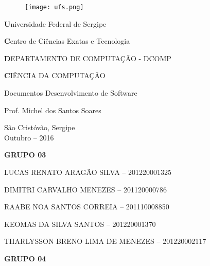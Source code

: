 \begin{titlepage}

\newcommand{\universidade}{Universidade Federal de Sergipe}
\newcommand{\centro}{Centro de Ciências Exatas e Tecnologia}
\newcommand{\departamento}{DEPARTAMENTO DE COMPUTAÇÃO - DCOMP}
\newcommand{\curso}{CIÊNCIA DA COMPUTAÇÃO}

\newcommand{\titulo}{Documentos Desenvolvimento de Software}

\newcommand{\professor}{Prof. Michel dos Santos Soares }

\begin{center}
\begin{figure}[t]
	\centering
	\texttt{[image: ufs.png]}
\end{figure}
{\large \textbf \universidade}
\par
{\large \textbf \centro}
\par
{\large \textbf \departamento}
\par
{\large \textbf \curso}
\par
\vspace{60pt}

{\large \titulo}
\par
\vspace{60pt}

{\large \professor}
\par
\vfill

{\large São Cristóvão, Sergipe}\\
{\large Outubro -- 2016}
\end{center}
\end{titlepage}



\newcommand{\alunoA}{LUCAS RENATO ARAGÃO SILVA -- 201220001325}
\newcommand{\alunoB}{DIMITRI CARVALHO MENEZES -- 201120000786}
\newcommand{\alunoC}{RAABE NOA SANTOS CORREIA -- 201110008850}
\newcommand{\alunoD}{KEOMAS DA SILVA SANTOS -- 201220001370}
\newcommand{\alunoE}{THARLYSSON BRENO LIMA DE MENEZES -- 201220002117}

\setcounter{page}{2}

\begin{center}

{\large \textbf {GRUPO 03}}
\par
\vspace{12pt}
{\normalsize \alunoA}
\par
{\normalsize \alunoB}
\par
{\normalsize \alunoC}
\par
{\normalsize \alunoD}
\par
{\normalsize \alunoE}
\par
\vspace{12pt}
{\large \textbf {GRUPO 04}}
\par

\end{center}
\clearpage



\renewcommand{\contentsname}{Conteúdo}
{
	\hypersetup{linkcolor=black}
	\tableofcontents
}

